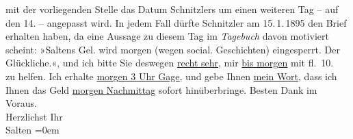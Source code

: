 \begin{ledgroupsized}[t]{13cm}
{{{                  mit der vorliegenden Stelle das Datum Schnitzlers um einen weiteren Tag – auf den 14. – angepasst
                  wird. In jedem Fall dürfte Schnitzler am
                     15. 1. 1895 den
                  Brief erhalten haben, da eine Aussage zu diesem Tag im \emph{Tagebuch} davon motiviert scheint: »Saltens Gel. wird morgen (wegen social.
                     Geschichten) eingesperrt. Der Glückliche.«}}}\label{K_L03148-11h}, und ich bitte Sie
               deswegen \uline{recht sehr}, mir \uline{bis morgen} mit fl. 10.~ zu helfen. Ich erhalte \uline{morgen 3 Uhr Gage}, und gebe Ihnen {\pb}\uline{mein Wort}, dass ich Ihnen das Geld \uline{morgen Nachmittag} sofort hinüberbringe. \pend
           \pstart
           Besten Dank im Voraus. {\\[\baselineskip]}Herzlichst Ihr {\\[\baselineskip]}\spacefill\mbox{Salten}\pend
           \leftskip=0em{}
         
         \endnumbering{}\end{ledgroupsized}\begin{anhang}\end{anhang}\newcommand{\dateiname}{L03148}\newcommand{\titel}{Felix Salten an Arthur Schnitzler, [14?. 1. 1895]}\newcommand{\editorInnen}{Martin Anton Müller und Laura Untner}
      